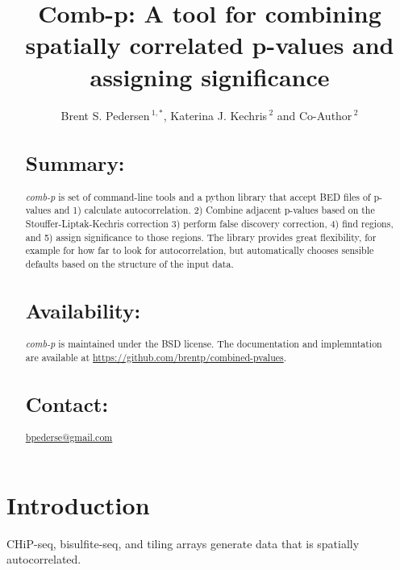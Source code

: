 \documentclass{bioinfo}
\begin{document}

\title[comb-p]{Comb-p: A tool for combining spatially correlated p-values and assigning significance}
\author[Pedersen \textit{et~al}]{Brent S. Pedersen\,$^{1,*}$, Katerina J. Kechris\,$^{2}$ and Co-Author\,$^2$}
\address{$^{1}$Department of Medicine, University of Colorado, Denver, Anschutz Medical Campus, Aurora CO 80045, USA\\
$^{2}$Department of Statistics, University of Colorado, Denver, Anschutz Medical Campus, Aurora CO 80045, USA\\
}
\maketitle
\begin{abstract}

\section{Summary:}
\textit{comb-p} is set of command-line tools and a python library that accept
BED files of p-values and 1) calculate autocorrelation. 2) Combine adjacent
p-values based on the Stouffer-Liptak-Kechris correction \citep{Kechris2010}
3) perform false discovery correction, 4) find regions, and 5) assign
significance to those regions. The library provides great flexibility, for
example for how far to look for autocorrelation, but automatically chooses 
sensible defaults based on the structure of the input data.

\section{Availability:}
 \textit{comb-p} is maintained under the BSD license. The documentation and
 implemntation are available at
 \href{https://github.com/brentp/combined-pvalues}{https://github.com/brentp/combined-pvalues}.
\section{Contact:} \href{bpederse@gmail.com}{bpederse@gmail.com}
\end{abstract}

\section{Introduction}
CHiP-seq, bisulfite-seq, and tiling arrays generate data that is spatially
autocorrelated.
\end{document}
